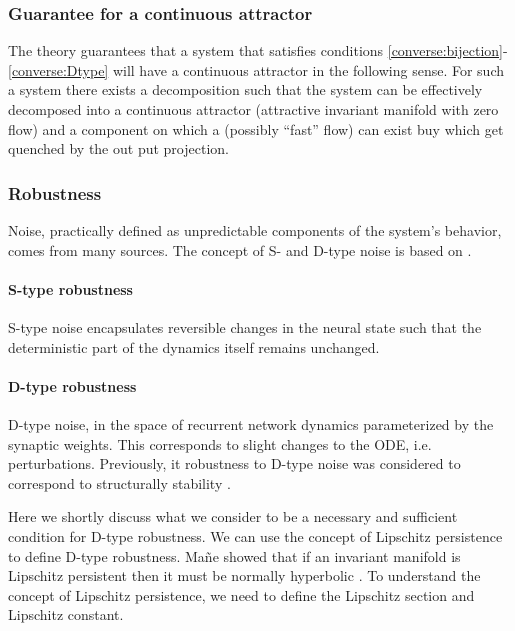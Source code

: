 \documentclass{article} %
\newcounter{ct}
\theoremstyle{definition}
\theoremstyle{remark}
\begin{document}
\subsubsection{Guarantee for a continuous attractor}\label{sec:near_ca}
The theory guarantees that a system that satisfies conditions \ref{converse:bijection}-\ref{converse:Dtype}  will have a continuous attractor in the following sense.
For such a system there exists a decomposition such that the system can be effectively decomposed into a continuous attractor (attractive invariant manifold with zero flow) and a component on which a (possibly ``fast'' flow) can exist buy which get quenched by the out put projection.


\subsubsection{Robustness}
Noise, practically defined as unpredictable components of the system’s behavior, comes from many sources.
The concept of S- and D-type noise is based on \citep{Park2023a}.

\paragraph{S-type robustness}\label{sec:stype}
S-type noise encapsulates reversible changes in the neural state such that the deterministic part of the dynamics itself remains unchanged.


\paragraph{D-type robustness}\label{sec:persitencempliesnh}
D-type noise, in the space of recurrent network dynamics parameterized by the synaptic weights.
This corresponds to slight changes to the ODE, i.e. perturbations.
Previously, it robustness to D-type noise was considered to correspond to structurally stability \citep{Park2023a}.

Here we shortly discuss what we consider to be a necessary and sufficient condition for D-type robustness.
We can use the concept of Lipschitz persistence to define D-type robustness.
Ma\~{n}e showed that if an invariant manifold is Lipschitz persistent then it must be normally hyperbolic \citep{mane1978persistent}. 
To understand the concept of Lipschitz persistence, we need to define the Lipschitz section and Lipschitz constant.
\end{document}
